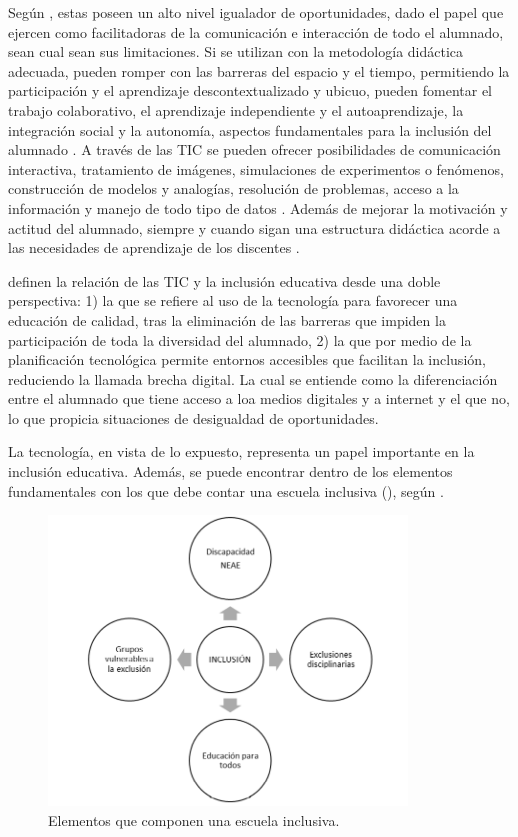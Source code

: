 \documentclass[spanish]{textolivre}
\begin{document}
Según \textcite{fernandezbatanero2019}, estas poseen un alto nivel igualador de oportunidades, dado el papel que ejercen como facilitadoras de la comunicación e interacción de todo el alumnado, sean cual sean sus limitaciones. Si se utilizan con la metodología didáctica adecuada, pueden romper con las barreras del espacio y el tiempo, permitiendo la participación y el aprendizaje descontextualizado y ubicuo, pueden fomentar el trabajo colaborativo, el aprendizaje independiente y el autoaprendizaje, la integración social y la autonomía, aspectos fundamentales para la inclusión del alumnado \cite{cascales-martinez2018}. A través de las TIC se pueden ofrecer posibilidades de comunicación interactiva, tratamiento de imágenes, simulaciones de experimentos o fenómenos, construcción de modelos y analogías, resolución de problemas, acceso a la información y manejo de todo tipo de datos \cite{cadenagonzalez2019}. Además de mejorar la motivación y actitud del alumnado, siempre y cuando sigan una estructura didáctica acorde a las necesidades de aprendizaje de los discentes \cite{morenoguerrero2018}.  

\textcite{caberoalmenara2017} definen la relación de las TIC y la inclusión educativa desde una doble perspectiva: 1) la que se refiere al uso de la tecnología para favorecer una educación de calidad, tras la eliminación de las barreras que impiden la participación de toda la diversidad del alumnado, 2) la que por medio de la planificación tecnológica permite entornos accesibles que facilitan la inclusión, reduciendo la llamada brecha digital. La cual se entiende como la diferenciación entre el alumnado que tiene acceso a loa medios digitales y a internet y el que no, lo que propicia situaciones de desigualdad de oportunidades.

La tecnología, en vista de lo expuesto, representa un papel importante en la inclusión educativa. Además, se puede encontrar dentro de los elementos fundamentales con los que debe contar una escuela inclusiva (), según \textcite{caberoalmenara2017}.

\begin{figure}[htbp]
 \centering
 \includegraphics[width=0.85\textwidth]{imagem2.png}
 \caption{Elementos que componen una escuela inclusiva.}
 \label{fig2}
\end{figure}
\end{document}
